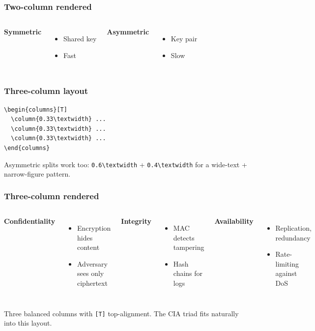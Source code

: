 \documentclass[aspectratio=169]{beamer}
\begin{document}
\begin{frame}[t]
  \frametitle{Two-column rendered}

  \begin{columns}[T]
      \textbf{Symmetric}
      \begin{itemize}\item Shared key\item Fast\end{itemize}
      \textbf{Asymmetric}
      \begin{itemize}\item Key pair\item Slow\end{itemize}
  \end{columns}
\end{frame}

\begin{frame}[t,fragile]
  \frametitle{Three-column layout}

  \begin{lstlisting}
\begin{columns}[T]
  \column{0.33\textwidth} ...
  \column{0.33\textwidth} ...
  \column{0.33\textwidth} ...
\end{columns}
  \end{lstlisting}

  \vspace{0.4em}
  Asymmetric splits work too: \texttt{0.6\textbackslash textwidth} +
  \texttt{0.4\textbackslash textwidth} for a wide-text + narrow-figure
  pattern.
\end{frame}

\begin{frame}[t]
  \frametitle{Three-column rendered}

  \begin{columns}[T]
      \textbf{Confidentiality}
      \begin{itemize}\setlength\itemsep{0pt}
        \item Encryption hides content
        \item Adversary sees only ciphertext
      \end{itemize}
      \textbf{Integrity}
      \begin{itemize}\setlength\itemsep{0pt}
        \item MAC detects tampering
        \item Hash chains for logs
      \end{itemize}
      \textbf{Availability}
      \begin{itemize}\setlength\itemsep{0pt}
        \item Replication, redundancy
        \item Rate-limiting against DoS
      \end{itemize}
  \end{columns}

  \vspace{0.6em}
  Three balanced columns with \texttt{[T]} top-alignment. The CIA triad
  fits naturally into this layout.
\end{frame}
\end{document}
